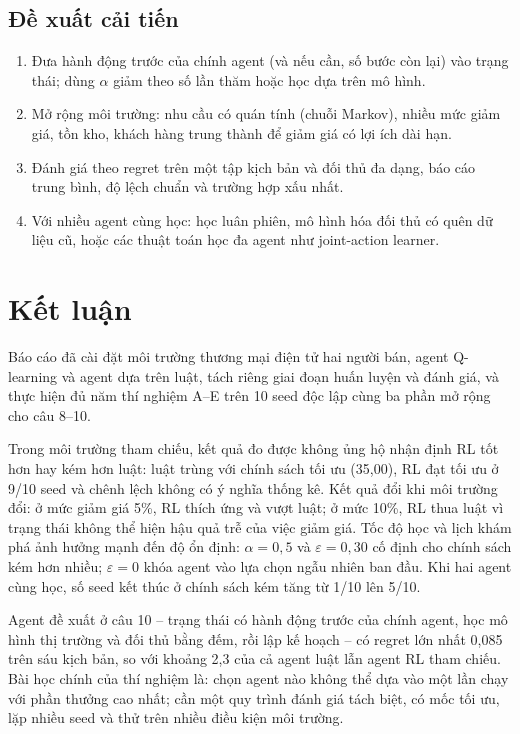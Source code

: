 \documentclass[12pt,a4paper]{report}
\begin{document}
\section{Đề xuất cải tiến}
\begin{enumerate}
\item Đưa hành động trước của chính agent (và nếu cần, số bước còn lại) vào trạng
  thái; dùng $\alpha$ giảm theo số lần thăm hoặc học dựa trên mô hình.
\item Mở rộng môi trường: nhu cầu có quán tính (chuỗi Markov), nhiều mức giảm giá,
  tồn kho, khách hàng trung thành để giảm giá có lợi ích dài hạn.
\item Đánh giá theo regret trên một tập kịch bản và đối thủ đa dạng, báo cáo trung
  bình, độ lệch chuẩn và trường hợp xấu nhất.
\item Với nhiều agent cùng học: học luân phiên, mô hình hóa đối thủ có quên dữ liệu
  cũ, hoặc các thuật toán học đa agent như joint-action learner.
\end{enumerate}

\chapter{Kết luận}
\label{chap:conclusion}
Báo cáo đã cài đặt môi trường thương mại điện tử hai người bán, agent Q-learning và
agent dựa trên luật, tách riêng giai đoạn huấn luyện và đánh giá, và thực hiện đủ
năm thí nghiệm A--E trên 10 seed độc lập cùng ba phần mở rộng cho câu 8--10.

Trong môi trường tham chiếu, kết quả đo được không ủng hộ nhận định RL tốt hơn hay kém
hơn luật: luật trùng với chính sách tối ưu (35{,}00), RL đạt tối ưu ở 9/10 seed và
chênh lệch không có ý nghĩa thống kê. Kết quả đổi khi môi trường đổi: ở mức giảm giá
5\%, RL thích ứng và vượt luật; ở mức 10\%, RL thua luật vì trạng thái không thể hiện
hậu quả trễ của việc giảm giá. Tốc độ học và lịch khám phá ảnh hưởng mạnh đến độ ổn
định: $\alpha=0{,}5$ và $\varepsilon=0{,}30$ cố định cho chính sách kém hơn nhiều;
$\varepsilon=0$ khóa agent vào lựa chọn ngẫu nhiên ban đầu. Khi hai agent cùng học,
số seed kết thúc ở chính sách kém tăng từ 1/10 lên 5/10.

Agent đề xuất ở câu 10 -- trạng thái có hành động trước của chính agent, học mô hình
thị trường và đối thủ bằng đếm, rồi lập kế hoạch -- có regret lớn nhất 0{,}085 trên
sáu kịch bản, so với khoảng 2{,}3 của cả agent luật lẫn agent RL tham chiếu. Bài học
chính của thí nghiệm là: chọn agent nào không thể dựa vào một lần chạy với phần
thưởng cao nhất; cần một quy trình đánh giá tách biệt, có mốc tối ưu, lặp nhiều seed
và thử trên nhiều điều kiện môi trường.
\end{document}
